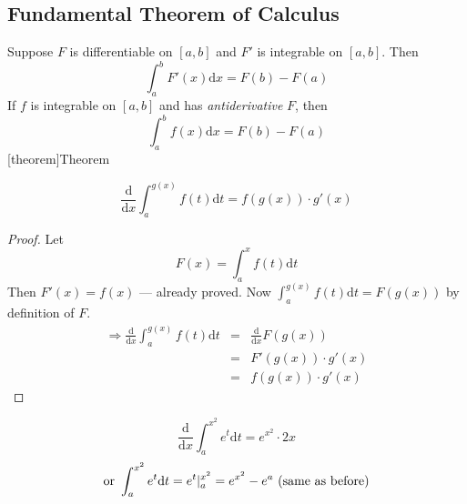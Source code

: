 \documentclass[12pt]{report}
\theoremstyle{definition}
\begin{document}
\subsection{Fundamental Theorem of Calculus}
Suppose $F$ is differentiable on $[a,b]$ and $F'$ is integrable on $[a,b]$. Then \[
    \int_a^b F'(x)\mathrm{d}x = F(b) - F(a)
\] If $f$ is integrable on $[a,b]$ and has \emph{antiderivative} $F$, then \[
    \int_a^b f(x)\mathrm{d}x = F(b) - F(a)
\]
[theorem]{Theorem}
\begin{FTC}
    \[
        \frac{\mathrm{d}}{\mathrm{d}x}\int_a^{g(x)} f(t)\mathrm{d}t = f(g(x))\cdot g'(x)
    \]
\end{FTC}
\begin{proof}
    Let \[
        F(x) = \int_a^x f(t)\mathrm{d}t
    \]
    Then $F'(x) = f(x)$ --- already proved.
    Now $\int_a^{g(x)} f(t)\mathrm{d}t = F(g(x))$ by definition of $F$.
    \begin{eqnarray*}
            \Rightarrow \frac{\mathrm{d}}{\mathrm{d}x} \int_a^{g(x)}f(t)\mathrm{d}t 
            &=& \frac{\mathrm{d}}{\mathrm{d}x} F(g(x)) \\
            &=& F'(g(x)) \cdot g'(x) \\
            &=& f(g(x)) \cdot g'(x)
    \end{eqnarray*}
\end{proof}
\begin{ex}
    \[
        \frac{\mathrm{d}}{\mathrm{d}x} \int_a^{x^2} e^t \mathrm{d}t = e^{x^{2}} \cdot 2x 
    \]\[
    \textnormal{or } \int_a^{x^{2}} e^{t}\mathrm{d}t = e^{t} |_a^{x^{2}} = e^{x^{2}} - e^{a} \textnormal{ (same as before)}
    \]
\end{ex}
\end{document}
